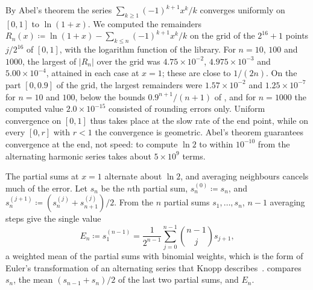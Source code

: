 By Abel's theorem the series $\sum_{k\ge1}(-1)^{k+1}x^k/k$ converges uniformly on $[0,1]$ to $\ln(1+x)$. We computed the remainders $R_n(x)\coloneqq\ln(1+x)-\sum_{k\le n}(-1)^{k+1}x^k/k$ on the grid of the $2^{16}+1$ points $j/2^{16}$ of $[0,1]$, with the logarithm function of the library. For $n=10$, $100$ and $1000$, the largest of $|R_n|$ over the grid was $4.75\times10^{-2}$, $4.975\times10^{-3}$ and $5.00\times10^{-4}$, attained in each case at $x=1$; these are close to $1/(2n)$. On the part $[0,0.9]$ of the grid, the largest remainders were $1.57\times10^{-2}$ and $1.25\times10^{-7}$ for $n=10$ and $100$, below the bounds $0.9^{n+1}/(n+1)$ of , and for $n=1000$ the computed value $2.0\times10^{-15}$ consisted of rounding errors only. Uniform convergence on $[0,1]$ thus takes place at the slow rate of the end point, while on every $[0,r]$ with $r<1$ the convergence is geometric. Abel's theorem guarantees convergence at the end, not speed: to compute $\ln2$ to within $10^{-10}$ from the alternating harmonic series takes about $5\times10^9$ terms.

The partial sums at $x=1$ alternate about $\ln2$, and averaging neighbours cancels much of the error. Let $s_n$ be the $n$th partial sum, $s_n^{(0)}\coloneqq s_n$, and $s_n^{(j+1)}\coloneqq(s_n^{(j)}+s_{n+1}^{(j)})/2$. From the $n$ partial sums $s_1,\ldots,s_n$, $n-1$ averaging steps give the single value
\[
E_n\coloneqq s_1^{(n-1)}=\frac1{2^{n-1}}\sum_{j=0}^{n-1}\binom{n-1}js_{j+1} ,
\]
a weighted mean of the partial sums with binomial weights, which is the form of Euler's transformation of an alternating series that Knopp describes~\cite{knopp1990}.  compares $s_n$, the mean $(s_{n-1}+s_n)/2$ of the last two partial sums, and $E_n$.

\begin{table}
\end{table}

